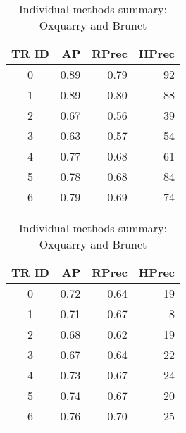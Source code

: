 \twocolumn

\begin{table}[H]
  \centering
  \caption{Individual methods summary: Oxquarry and Brunet}
  \label{tab:rls_oxquarry_brunet}

  \begin{tabular}{c r r r}
    \toprule
    TR ID & AP & RPrec & HPrec \\
    \midrule
    0 & 0.89 & 0.79 & 92 \\
    1 & 0.89 & 0.80 & 88 \\
    2 & 0.67 & 0.56 & 39 \\
    3 & 0.63 & 0.57 & 54 \\
    4 & 0.77 & 0.68 & 61 \\
    5 & 0.78 & 0.68 & 84 \\
    6 & 0.79 & 0.69 & 74 \\
    \bottomrule
  \end{tabular}

  \vspace{0.5cm}

  \begin{tabular}{c r r r}
    \toprule
    TR ID & AP & RPrec & HPrec \\
    \midrule
    0 & 0.72 & 0.64 & 19 \\
    1 & 0.71 & 0.67 &  8 \\
    2 & 0.68 & 0.62 & 19 \\
    3 & 0.67 & 0.64 & 22 \\
    4 & 0.73 & 0.67 & 24 \\
    5 & 0.74 & 0.67 & 20 \\
    6 & 0.76 & 0.70 & 25 \\
    \bottomrule
  \end{tabular}
\end{table}


